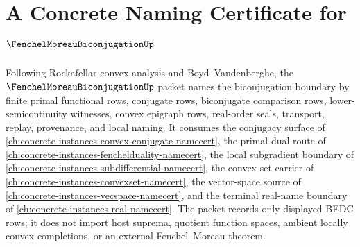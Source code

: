 \chapter{A Concrete Naming Certificate for $\FenchelMoreauBiconjugationUp$}
\label{ch:concrete-instances-fenchel-moreau-biconjugation-namecert}

Following Rockafellar convex analysis and Boyd--Vandenberghe, the $\FenchelMoreauBiconjugationUp$ packet names the biconjugation boundary by finite primal functional rows, conjugate rows, biconjugate comparison rows, lower-semicontinuity witnesses, convex epigraph rows, real-order seals, transport, replay, provenance, and local naming. It consumes the conjugacy surface of \autoref{ch:concrete-instances-convex-conjugate-namecert}, the primal-dual route of \autoref{ch:concrete-instances-fenchelduality-namecert}, the local subgradient boundary of \autoref{ch:concrete-instances-subdifferential-namecert}, the convex-set carrier of \autoref{ch:concrete-instances-convexset-namecert}, the vector-space source of \autoref{ch:concrete-instances-vecspace-namecert}, and the terminal real-name boundary of \autoref{ch:concrete-instances-real-namecert}. The packet records only displayed BEDC rows; it does not import host suprema, quotient function spaces, ambient locally convex completions, or an external Fenchel--Moreau theorem.


